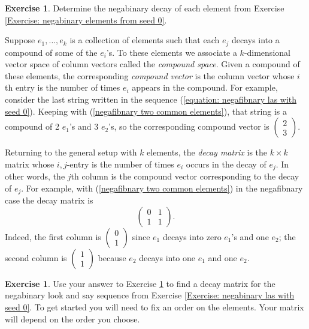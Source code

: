 \documentclass[reqno]{amsart}
\theoremstyle{definition}
\newtheorem{exercise}[theorem]{Exercise}
\begin{document}
\begin{exercise}\label{Exercise: negabinary decay from seed 0}
    Determine the negabinary decay of each element from Exercise \ref{Exercise: negabinary elements from seed 0}.
\end{exercise}

Suppose $e_1,\ldots,e_k$ is a collection of elements such that each $e_j$ decays into a compound of some of the $e_i$'s. To these elements we associate a $k$-dimensional vector space of column vectors called the \emph{compound space}. Given a compound of these elements, the corresponding \emph{compound vector} is the column vector whose $i$th entry is the number of times $e_i$ appears in the compound. For example, consider the last string written in the sequence (\ref{equation: negafibnary las with seed 0}). Keeping with (\ref{negafibnary two common elements}), that string is a compound of 2 $e_1$'s and 3 $e_2$'s, so the corresponding compound vector is 
$\begin{pmatrix}
    2 \\ 3
\end{pmatrix}$.

Returning to the general setup with $k$ elements, the \emph{decay matrix} is the $k\times k$ matrix whose $i,j$-entry is the number of times $e_i$ occurs in the decay of $e_j$. In other words, the $j$th column is the compound vector corresponding to the decay of $e_j$. For example, with (\ref{negafibnary two common elements}) in the negafibnary case the decay matrix is 
\begin{equation}\label{negafibnary 2x2 decay matrix}
    \begin{pmatrix}
        0 & 1\\
        1 & 1
    \end{pmatrix}.
\end{equation}
Indeed, the first column is 
$\begin{pmatrix}
        0 \\
        1 
\end{pmatrix} $
since  $e_1$ decays into zero $e_1$'s and one $e_2$; the second column is 
$\begin{pmatrix}
        1 \\
        1 
\end{pmatrix}$
because $e_2$ decays into one $e_1$ and one $e_2$. 

\begin{exercise}\label{exercise: negabinary decay matrix for seed 0}
    Use your answer to Exercise \ref{Exercise: negabinary decay from seed 0} to find a decay matrix for the negabinary look and say sequence from Exercise \ref{Exercise: negabinary las with seed 0}. To get started you will need to fix an order on the elements. Your matrix will depend on the order you choose. 
\end{exercise}
\end{document}

